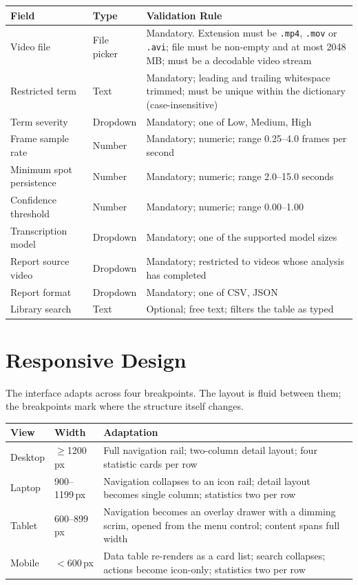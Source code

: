 \documentclass[12pt,a4paper,twoside]{article}
\begin{document}
\begin{longtable}{|p{3.6cm}|p{2.6cm}|p{6.4cm}|}
\hline
\textbf{Field} & \textbf{Type} & \textbf{Validation Rule}\\
\hline
\endhead
Video file & File picker & Mandatory. Extension must be \texttt{.mp4}, \texttt{.mov} or
\texttt{.avi}; file must be non-empty and at most 2048\,MB; must be a decodable video
stream\\
\hline
Restricted term & Text & Mandatory; leading and trailing whitespace trimmed; must be
unique within the dictionary (case-insensitive)\\
\hline
Term severity & Dropdown & Mandatory; one of Low, Medium, High\\
\hline
Frame sample rate & Number & Mandatory; numeric; range 0.25--4.0 frames per second\\
\hline
Minimum spot persistence & Number & Mandatory; numeric; range 2.0--15.0 seconds\\
\hline
Confidence threshold & Number & Mandatory; numeric; range 0.00--1.00\\
\hline
Transcription model & Dropdown & Mandatory; one of the supported model sizes\\
\hline
Report source video & Dropdown & Mandatory; restricted to videos whose analysis has
completed\\
\hline
Report format & Dropdown & Mandatory; one of CSV, JSON\\
\hline
Library search & Text & Optional; free text; filters the table as typed\\
\hline
\end{longtable}

\section{Responsive Design}

The interface adapts across four breakpoints. The layout is fluid between them; the
breakpoints mark where the structure itself changes.

\begin{table}[htbp]
\centering
\begin{tabular}{|p{2.4cm}|p{2.4cm}|p{7.6cm}|}
\hline
\textbf{View} & \textbf{Width} & \textbf{Adaptation}\\
\hline
Desktop & $\geq$1200\,px & Full navigation rail; two-column detail layout; four
statistic cards per row\\
\hline
Laptop & 900--1199\,px & Navigation collapses to an icon rail; detail layout becomes
single column; statistics two per row\\
\hline
Tablet & 600--899\,px & Navigation becomes an overlay drawer with a dimming scrim,
opened from the menu control; content spans full width\\
\hline
Mobile & $<$600\,px & Data table re-renders as a card list; search collapses; actions
become icon-only; statistics two per row\\
\hline
\end{tabular}
\end{table}
\end{document}
